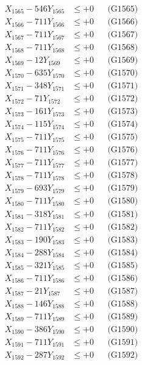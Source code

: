 \documentclass[a4paper,10pt]{article}
\begin{document}
{\begin{align}
X_{1565} - 546Y_{1565} &\leq +0 && \text{(G1565)} \\
X_{1566} - 711Y_{1566} &\leq +0 && \text{(G1566)} \\
X_{1567} - 711Y_{1567} &\leq +0 && \text{(G1567)} \\
X_{1568} - 711Y_{1568} &\leq +0 && \text{(G1568)} \\
X_{1569} - 12Y_{1569} &\leq +0 && \text{(G1569)} \\
X_{1570} - 635Y_{1570} &\leq +0 && \text{(G1570)} \\
\allowbreak
X_{1571} - 348Y_{1571} &\leq +0 && \text{(G1571)} \\
X_{1572} - 71Y_{1572} &\leq +0 && \text{(G1572)} \\
X_{1573} - 161Y_{1573} &\leq +0 && \text{(G1573)} \\
X_{1574} - 115Y_{1574} &\leq +0 && \text{(G1574)} \\
X_{1575} - 711Y_{1575} &\leq +0 && \text{(G1575)} \\
X_{1576} - 711Y_{1576} &\leq +0 && \text{(G1576)} \\
X_{1577} - 711Y_{1577} &\leq +0 && \text{(G1577)} \\
X_{1578} - 711Y_{1578} &\leq +0 && \text{(G1578)} \\
X_{1579} - 693Y_{1579} &\leq +0 && \text{(G1579)} \\
X_{1580} - 711Y_{1580} &\leq +0 && \text{(G1580)} \\
\allowbreak
X_{1581} - 318Y_{1581} &\leq +0 && \text{(G1581)} \\
X_{1582} - 711Y_{1582} &\leq +0 && \text{(G1582)} \\
X_{1583} - 190Y_{1583} &\leq +0 && \text{(G1583)} \\
X_{1584} - 288Y_{1584} &\leq +0 && \text{(G1584)} \\
X_{1585} - 321Y_{1585} &\leq +0 && \text{(G1585)} \\
X_{1586} - 711Y_{1586} &\leq +0 && \text{(G1586)} \\
X_{1587} - 21Y_{1587} &\leq +0 && \text{(G1587)} \\
X_{1588} - 146Y_{1588} &\leq +0 && \text{(G1588)} \\
X_{1589} - 711Y_{1589} &\leq +0 && \text{(G1589)} \\
X_{1590} - 386Y_{1590} &\leq +0 && \text{(G1590)} \\
\allowbreak
X_{1591} - 711Y_{1591} &\leq +0 && \text{(G1591)} \\
X_{1592} - 287Y_{1592} &\leq +0 && \text{(G1592)} \\

\end{align}}
\end{document}
